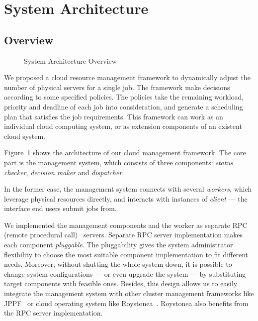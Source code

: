 \section{System Architecture}\label{sec:arch}

\subsection{Overview}

\begin{figure}[h]
  \centering
  
  \caption{System Architecture Overview}
  \label{fig:archi-overview}
\end{figure}

We proposed a cloud resource management framework to dynamically adjust
the number of physical servers for a single job.
The framework make decisions according to some specified policies.
The policies take the remaining workload, priority and deadline of each
job into consideration, and generate a scheduling plan that satisfies
the job requirements.
This framework can work as an individual cloud computing system, or as
extension components of an existent cloud system.

Figure~\ref{fig:archi-overview} shows the architecture of our cloud
management framework.
The core part is the management system, which consists of three
components: \emph{status checker}, \emph{decision maker} and
\emph{dispatcher}.

In the former case, the management system connects with several
\emph{workers}, which leverage physical resources directly, and
interacts with instances of \emph{client} --- the interface end users
submit jobs from.

We implemented the management components and the worker as separate RPC
(remote procedural call)~\cite{cite:RPC} servers.
Separate RPC server implementation makes each component
\emph{pluggable}.
The pluggability gives the system administrator flexibility to choose
the most suitable component implementation to fit different needs.
Moreover, without shutting the whole system down, it is possible to
change system configurations --- or even upgrade the system --- by
substituting target components with feasible ones.
Besides, this design allows us to easily integrate the management system
with other cluster management frameworks like JPPF~\cite{cite:JPPF} or
cloud operating system like Roystonea~\cite{cite:roystonea}.
Roystonea also benefits from the RPC server implementation.

